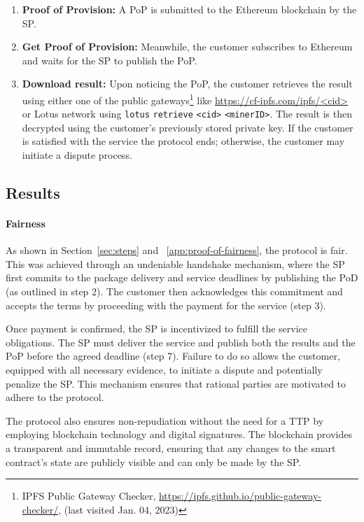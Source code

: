 \documentclass[pdftex,twocolumn,epjc3]{svjour3}
\begin{document}
\begin{enumerate}
  \item \textbf{Proof of Provision:} A PoP is submitted to the Ethereum blockchain by the SP.

    \item \textbf{Get Proof of Provision:} Meanwhile, the customer subscribes to Ethereum and waits for the SP to publish the PoP.


  \item \textbf{Download result:} Upon noticing the PoP, the customer retrieves the result using either one of the public gateways\footnote{IPFS Public Gateway Checker, \url{https://ipfs.github.io/public-gateway-checker/}, (last visited Jan. 04, 2023)} like \url{https://cf-ipfs.com/ipfs/<cid>} or Lotus network using \texttt{lotus} \texttt{retrieve} \texttt{<cid>} \texttt{<minerID>}. The result is then decrypted using the customer's previously stored private key. If the customer is satisfied with the service the protocol ends; otherwise, the customer may initiate a dispute process.
  
\end{enumerate}

\subsection{Results}

\paragraph{Fairness}
As shown in Section~\ref{sec:steps} and ~\ref{app:proof-of-fairness}, the protocol is fair. This was achieved through an undeniable handshake mechanism, where the SP first commits to the package delivery and service deadlines by publishing the PoD (as outlined in step 2). The customer then acknowledges this commitment and accepts the terms by proceeding with the payment for the service (step 3).

Once payment is confirmed, the SP is incentivized to fulfill the service obligations. The SP must deliver the service and publish both the results and the PoP before the agreed deadline (step 7). Failure to do so allows the customer, equipped with all necessary evidence, to initiate a dispute and potentially penalize the SP. This mechanism ensures that rational parties are motivated to adhere to the protocol.

The protocol also ensures non-repudiation without the need for a TTP by employing blockchain technology and digital signatures. The blockchain provides a transparent and immutable record, ensuring that any changes to the smart contract's state are publicly visible and can only be made by the SP.
\end{document}
